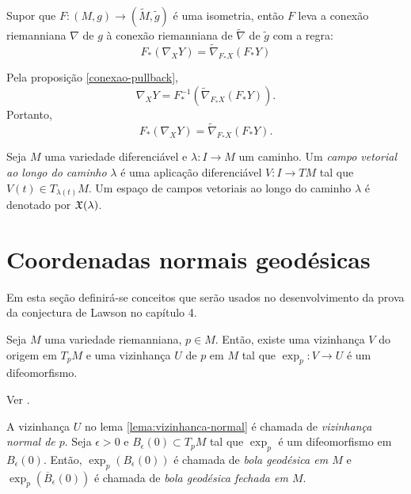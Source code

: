 \begin{proposicao}
	Supor que $F: (M,g) \rightarrow (\tilde{M}, \tilde{g})$ é uma isometria, então $F$ leva a conexão riemanniana $\nabla$ de $g$ à conexão riemanniana de $\tilde{\nabla}$ de $\tilde{g}$ com a regra:
	\begin{equation*}
		F_* (\nabla_X Y) = \tilde{\nabla}_{F_* X} (F_* Y)
	\end{equation*}
\end{proposicao}

\begin{demonstracao}
	Pela proposição \ref{conexao-pullback}, 
	\begin{equation*}
		\nabla_X Y = F^{-1}_* \left( \tilde{\nabla}_{F_* X} (F_* Y) \right).
	\end{equation*}
	Portanto,
	\begin{equation*}
		F_* (\nabla_X Y) = \tilde{\nabla}_{F_* X} (F_* Y).
	\end{equation*}
\end{demonstracao}

\begin{definicao}
	Seja $M$ uma variedade diferenciável e
	$\lambda: I \rightarrow M$ um caminho.
	Um \emph{campo vetorial ao longo do caminho} $\lambda$ é uma aplicação diferenciável $V: I \rightarrow TM$ tal que $V(t) \in T_{\lambda(t)} M$.
	Um espaço de campos vetoriais ao longo do caminho $\lambda$ é denotado por $\mathfrak{X}(\lambda)$.
\end{definicao}



\section{Coordenadas normais geodésicas}

Em esta seção definirá-se conceitos que serão usados no desenvolvimento da prova da conjectura de Lawson no capítulo 4.

\begin{lema}\label{lema:vizinhanca-normal}
	Seja
	$M$ uma variedade riemanniana,
	$p \in M$.
	Então, existe uma vizinhança $V$ do origem em $T_p M$ e uma vizinhança $U$ de $p$ em $M$ tal que $\exp_p: V \rightarrow U$ é um difeomorfismo.
\end{lema}

\begin{demonstracao}
	Ver \cite[Lemma 5.10]{Lee1997}.
\end{demonstracao}

\begin{definicao}
	A vizinhança $U$ no lema \ref{lema:vizinhanca-normal} é chamada de \emph{vizinhança normal de $p$}.
	Seja
	$\epsilon > 0$ e
	$B_{\epsilon}(0) \subset T_p M$ tal que $\exp_p$ é um difeomorfismo em $B_{\epsilon}(0)$.
	Então,
	$\exp_p(B_{\epsilon}(0))$ é chamada de \emph{bola geodésica em $M$} e
	$\exp_p(\overline{B}_{\epsilon}(0))$ é chamada de \emph{bola geodésica fechada em $M$}.
\end{definicao}

